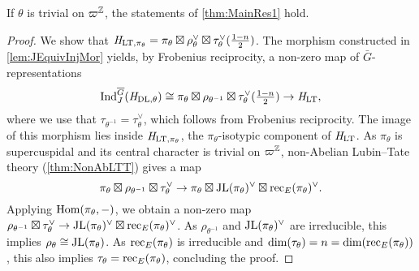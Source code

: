 \documentclass[../main.tex]{subfiles}
\begin{document}
\begin{lem}\label{lem:FirstCaseOfMainRes1}
  If $\theta$ is trivial on $\varpi^{\mathbb{Z}}$, the statements of 
  \cref{thm:MainRes1} hold.
\begin{proof}
  We show that $\mathit H_{\mathrm{LT},\pi_\theta} = \pi_\theta \boxtimes \rho_\theta^\vee 
  \boxtimes \tau_\theta^{\vee}(\tfrac{1-n}2)$. 
  The morphism constructed in \cref{lem:JEquivInjMor} yields, by Frobenius
  reciprocity, a non-zero map of ${\bar G}$-representations
  \begin{equation} \label{eq:WantedMap}
    \operatorname{Ind}_{J}^{\overline G} (\mathit H_{\mathrm{DL},\theta}) \cong \pi_\theta \boxtimes \rho_{\theta^{-1}}
    \boxtimes \tau_\theta^\vee (\tfrac{1-n}2) \to \mathit H_{\mathrm{LT}},
  \end{equation}
  where we use that $\tau_{\theta^{-1}} = \tau_\theta^\vee$, which follows from 
  Frobenius reciprocity. The image of this morphism lies inside $\mathit H_{\mathrm{LT},
  \pi_\theta}$, the $\pi_\theta$-isotypic component of $\mathit H_{\mathrm{LT}}$. 
  As $\pi_\theta$ is supercuspidal and its central character is trivial on 
  $\varpi^{\mathbb{Z}}$, non-Abelian Lubin--Tate theory (\cref{thm:NonAbLTT}) gives 
  a map 
  \begin{equation*}
    \pi_\theta \boxtimes \rho_{\theta^{-1}} \boxtimes \tau_\theta^{\vee} \to
    \pi_\theta \boxtimes \mathrm{JL}(\pi_\theta)^\vee \boxtimes
    \mathrm{rec}_E(\pi_\theta)^\vee.
  \end{equation*}
  Applying $\operatorname{Hom}(\pi_\theta, -)$, we obtain a non-zero map 
  $\rho_{\theta^{-1}} \boxtimes \tau_\theta^{\vee} \to \mathrm{JL}(\pi_\theta)^\vee
  \boxtimes \mathrm{rec}_E(\pi_\theta)^\vee$.
  As $\rho_{\theta^{-1}}$ and $\mathrm{JL}(\pi_\theta)^\vee$ are irreducible, this 
  implies $\rho_\theta \cong \mathrm{JL}(\pi_\theta)$.
  As $\mathrm{rec}_E(\pi_\theta)$ is irreducible and $\dim(\tau_\theta) = n = \dim
  (\mathrm{rec}_E(\pi_\theta))$, this also implies $\tau_\theta = \mathrm{rec}_E(\pi_\theta)$,
  concluding the proof.
\end{proof}
\end{lem}
\end{document}
